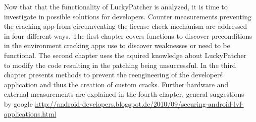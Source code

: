 Now that that the functionality of LuckyPatcher is analyzed, it is time to investigate in possible solutions for developers. Counter measurements preventing the cracking app from circumventing the license check mechanism are addressed in four different ways.\newline
The first chapter covers functions to discover preconditions in the environment cracking apps use to discover weaknesses or need to be functional. The second chapter uses the aquired knowledge about LuckyPatcher to modify the code resulting in the patching being unsuccessful. In the third chapter presents methods to prevent the reengineering of the developer\'s application and thus the creation of custom cracks. Further hardware and external measurements are explained in the fourth chapter.\newline
general suggestions by google  \url{http://android-developers.blogspot.de/2010/09/securing-android-lvl-applications.html}
